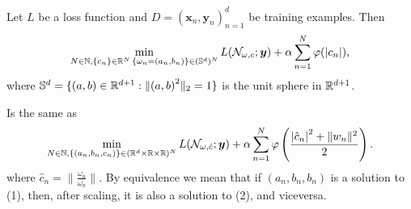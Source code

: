 \documentclass[twoside]{article}
\begin{document}
\begin{theorem}
	Let $L$ be a loss function and $D = (\bm{x}_{n}, \bm{y}_{n})_{n=1}^{d}$ be training examples. Then
	\begin{equation}
		\min_{N \in \mathbb{N}, \{c_{n}\} \in \mathbb{R}^{N}\, \{\omega_{n} = (a_{n}, b_{n})\} \in (\mathbb{S}^{d})^{N}}
		L(\mathcal{N}_{\omega, c} ; \bm{y}) + \alpha \sum_{n=1}^{N} \varphi(\abs{c_{n}}),
	\end{equation}
	where $\mathbb{S}^{d} = \{(a,b) \in \mathbb{R}^{d + 1} : \lVert {(a,b)}^{2} \rVert_{2} = 1\}$ is the unit sphere in $\mathbb{R}^{d + 1}$.

	Is the same as
	\begin{equation}
		\min_{N \in \mathbb{N}, \{(a_{n}, b_{n}, c_{n})\}\in (\mathbb{R}^{d} \times \mathbb{R} \times \mathbb{R})^{N}} L(\mathcal{N}_{\omega, \hat{c}} ; \bm{y})
		+ \alpha \sum_{n=1}^{N} \varphi\left(\frac{\abs{\hat{c}_{n}}^{2} + \lVert w_{n} \rVert^{2}}{2}\right).
	\end{equation}
	where $\hat{c}_{n} = \lVert \frac{\omega_{n}}{\omega_{n}} \rVert$. By equivalence we mean that
	if $(a_{n}, b_{n}, b_{n})$ is a solution to (1), then, after scaling,
	it is also a solution to (2), and viceversa.
\end{theorem}
\end{document}
